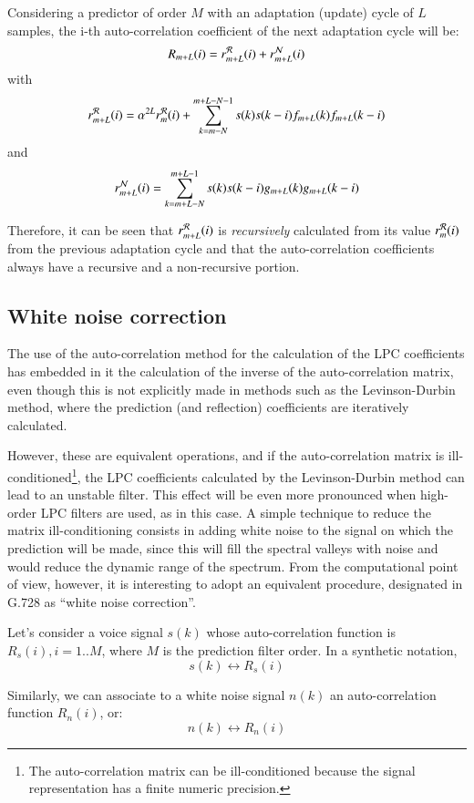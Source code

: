 Considering a predictor of order $M$ with an adaptation (update) cycle
of $L$ samples, the i-th auto-correlation coefficient of the next
adaptation cycle will be:
\[
R_{m+L}(i) = r_{m+L}^{\cal R}(i) + r_{m+L}^{\cal N}(i)
\]
with
\[
r_{m+L}^{\cal R}(i) = \alpha^{2L} r_m^{\cal R}(i) + 
         \sum_{k=m-N}^{m+L-N-1} s(k) s(k-i) f_{m+L}(k) f_{m+L}(k-i)
\]
and
\[
r_{m+L}^{\cal N}(i) = \sum_{k=m+L-N}^{m+L-1} s(k) s(k-i) g_{m+L}(k) g_{m+L}(k-i)
\]

Therefore, it can be seen that $r_{m+L}^{\cal R}(i)$ is {\em
recursively} calculated from its value $r_m^{\cal R}(i)$ from the
previous adaptation cycle and that the auto-correlation coefficients
always have a recursive and a non-recursive portion.


\subsection{White noise correction} 

The use of the auto-correlation method for the calculation of the LPC
coefficients has embedded in it the calculation of the inverse of the
auto-correlation matrix, even though this is not explicitly made in
methods such as the Levinson-Durbin method, where the prediction (and
reflection) coefficients are iteratively calculated.

However, these are equivalent operations, and if the auto-correlation
matrix is ill-conditioned\footnote{\sf The auto-correlation matrix can
  be ill-conditioned because the signal representation has a finite
  numeric precision.}, the LPC coefficients calculated by the
Levinson-Durbin method can lead to an unstable filter. This effect
will be even more pronounced when high-order LPC filters are used, as
in this case.  A simple technique to reduce the matrix
ill-conditioning consists in adding white noise to the signal on which
the prediction will be made, since this will fill the spectral valleys
with noise and would reduce the dynamic range of the spectrum. From
the computational point of view, however, it is interesting to adopt
an equivalent procedure, designated in G.728 as ``white noise
correction''.

Let's consider a voice signal $s(k)$ whose auto-correlation function is $R_s(i),
i=1..M$, where $M$ is the prediction filter order. In a synthetic
notation, 
\[
          s(k) \longleftrightarrow R_s(i)
\]

Similarly, we can associate to a white noise signal $n(k)$ an
auto-correlation function $R_n(i)$, or:
\[
          n(k) \longleftrightarrow R_n(i)
\]

